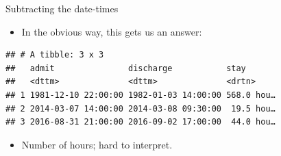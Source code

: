 \documentclass[ignorenonframetext,]{beamer}
\newenvironment{Shaded}{\begin{snugshade}}{\end{snugshade}}
\newcommand{\DataTypeTok}[1]{\textcolor[rgb]{0.13,0.29,0.53}{#1}}
\newcommand{\KeywordTok}[1]{\textcolor[rgb]{0.13,0.29,0.53}{\textbf{#1}}}
\newcommand{\NormalTok}[1]{#1}
\newcommand{\OperatorTok}[1]{\textcolor[rgb]{0.81,0.36,0.00}{\textbf{#1}}}
\newcommand{\StringTok}[1]{\textcolor[rgb]{0.31,0.60,0.02}{#1}}
\providecommand{\tightlist}{%
  \setlength{\itemsep}{0pt}\setlength{\parskip}{0pt}}
\begin{document}
\begin{frame}[fragile]{Subtracting the date-times}
\protect\hypertarget{subtracting-the-date-times}{}

\begin{itemize}
\tightlist
\item
  In the obvious way, this gets us an answer:
\end{itemize}

\begin{Shaded}
\end{Shaded}

\begin{verbatim}
## # A tibble: 3 x 3
##   admit               discharge           stay      
##   <dttm>              <dttm>              <drtn>    
## 1 1981-12-10 22:00:00 1982-01-03 14:00:00 568.0 hou…
## 2 2014-03-07 14:00:00 2014-03-08 09:30:00  19.5 hou…
## 3 2016-08-31 21:00:00 2016-09-02 17:00:00  44.0 hou…
\end{verbatim}

\begin{itemize}
\tightlist
\item
  Number of hours; hard to interpret.
\end{itemize}

\end{frame}
\end{document}

